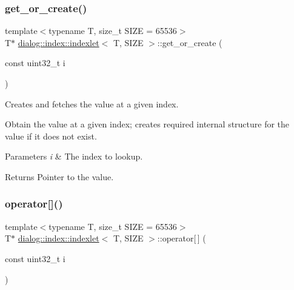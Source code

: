 \subsubsection{\texorpdfstring{get\+\_\+or\+\_\+create()}{get\_or\_create()}}
{\footnotesize\ttfamily template$<$typename T, size\+\_\+t S\+I\+ZE = 65536$>$ \\
T$\ast$ \hyperlink{classdialog_1_1index_1_1indexlet}{dialog\+::index\+::indexlet}$<$ T, S\+I\+ZE $>$\+::get\+\_\+or\+\_\+create (\begin{DoxyParamCaption}\item[{const uint32\+\_\+t}]{i }\end{DoxyParamCaption})\hspace{0.3cm}{\ttfamily [inline]}}



Creates and fetches the value at a given index. 

Obtain the value at a given index; creates required internal structure for the value if it does not exist.


\begin{DoxyParams}{Parameters}
{\em i} & The index to lookup. \\
\hline
\end{DoxyParams}
\begin{DoxyReturn}{Returns}
Pointer to the value. 
\end{DoxyReturn}
\mbox{\label{classdialog_1_1index_1_1indexlet_a879de6014445e5fdd8091a8f20ced31a}} 
\subsubsection{\texorpdfstring{operator[]()}{operator[]()}}
{\footnotesize\ttfamily template$<$typename T, size\+\_\+t S\+I\+ZE = 65536$>$ \\
T$\ast$ \hyperlink{classdialog_1_1index_1_1indexlet}{dialog\+::index\+::indexlet}$<$ T, S\+I\+ZE $>$\+::operator\mbox{[}$\,$\mbox{]} (\begin{DoxyParamCaption}\item[{const uint32\+\_\+t}]{i }\end{DoxyParamCaption})\hspace{0.3cm}{\ttfamily [inline]}}



